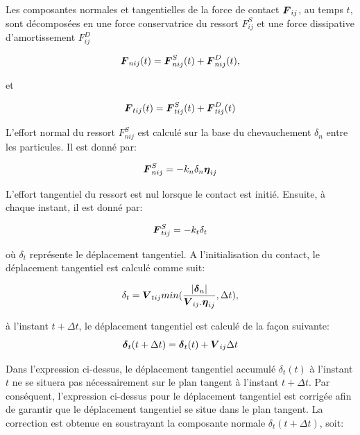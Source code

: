 Les composantes normales et tangentielles de la force de contact $\boldsymbol{F}_{ij}$, au temps $t$, sont décomposées en une force conservatrice du ressort $F^S_{ij}$ et une force dissipative  d'amortissement $F^D_{ij}$

\begin{equation} \label{eq: 9}
\boldsymbol{F}_{nij}(t) = \boldsymbol{F}^S_{nij}(t) + \boldsymbol{F}^D_{nij}(t),
\end{equation}

et

\begin{equation} \label{eq: 10}
\boldsymbol{F}_{tij}(t) = \boldsymbol{F}^S_{tij}(t) + \boldsymbol{F}^D_{tij}(t)
\end{equation}

L'effort normal du ressort $F^S_{nij}$ est calculé sur la base du chevauchement $\delta_n$ entre les particules. Il est donné par:

\begin{equation} \label{eq: 11}
\boldsymbol{F}^S_{nij} = - k_n \delta_n \boldsymbol{\eta}_{ij}
\end{equation}

L'effort tangentiel du ressort est nul lorsque le contact est initié. Ensuite, à chaque instant, il est donné par:

\begin{equation} \label{eq: 12}
\boldsymbol{F}^S_{tij} = - k_t \delta_t
\end{equation}

où $\delta_t$ représente le déplacement tangentiel. A l'initialisation du contact, le déplacement tangentiel est calculé comme suit:

\begin{equation} \label{eq: 13}
\delta_t = \boldsymbol{V}_{tij} min(\frac{|\boldsymbol{\delta}_n|}{\boldsymbol{V}_{ij}.\boldsymbol{\eta}_{ij}},\Delta t),
\end{equation}

\noindent à l'instant $t + \Delta t$, le déplacement tangentiel est calculé de la façon suivante:
%
\begin{equation} \label{eq: 14}
\boldsymbol{\delta}_t(t + \Delta t) = \boldsymbol{\delta}_t(t) + \boldsymbol{V}_{ij} \Delta t
\end{equation}

Dans l'expression ci-dessus, le déplacement tangentiel accumulé $\delta_t(t)$ à l'instant $t$ ne se situera pas nécessairement sur le plan tangent à l'instant $t + \Delta t$. Par conséquent, l'expression ci-dessus pour le déplacement tangentiel est corrigée afin de garantir que le déplacement tangentiel se situe dans le plan tangent. La correction est obtenue en soustrayant la composante normale $\delta_t(t + \Delta t)$, soit:

